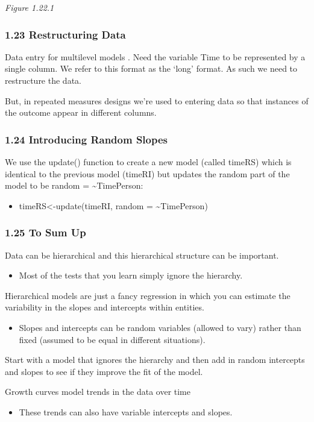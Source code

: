 \documentclass[
]{article}
\providecommand{\tightlist}{%
  \setlength{\itemsep}{0pt}\setlength{\parskip}{0pt}}
\begin{document}
\emph{Figure 1.22.1}

\hypertarget{restructuring-data}{%
\subsubsection{1.23 Restructuring Data}\label{restructuring-data}}

Data entry for multilevel models . Need the variable Time to be
represented by a single column. We refer to this format as the `long'
format. As such we need to restructure the data.

But, in repeated measures designs we're used to entering data so that
instances of the outcome appear in different columns.

\hypertarget{introducing-random-slopes}{%
\subsubsection{1.24 Introducing Random
Slopes}\label{introducing-random-slopes}}

We use the update() function to create a new model (called timeRS) which
is identical to the previous model (timeRI) but updates the random part
of the model to be random = \textasciitilde Time\textbar Person:

\begin{itemize}
\tightlist
\item
  timeRS\textless-update(timeRI, random =
  \textasciitilde Time\textbar Person)
\end{itemize}

\hypertarget{to-sum-up}{%
\subsubsection{1.25 To Sum Up}\label{to-sum-up}}

Data can be hierarchical and this hierarchical structure can be
important.

\begin{itemize}
\tightlist
\item
  Most of the tests that you learn simply ignore the hierarchy.
\end{itemize}

Hierarchical models are just a fancy regression in which you can
estimate the variability in the slopes and intercepts within entities.

\begin{itemize}
\tightlist
\item
  Slopes and intercepts can be random variables (allowed to vary) rather
  than fixed (assumed to be equal in different situations).
\end{itemize}

Start with a model that ignores the hierarchy and then add in random
intercepts and slopes to see if they improve the fit of the model.

Growth curves model trends in the data over time

\begin{itemize}
\tightlist
\item
  These trends can also have variable intercepts and slopes.
\end{itemize}
\end{document}
